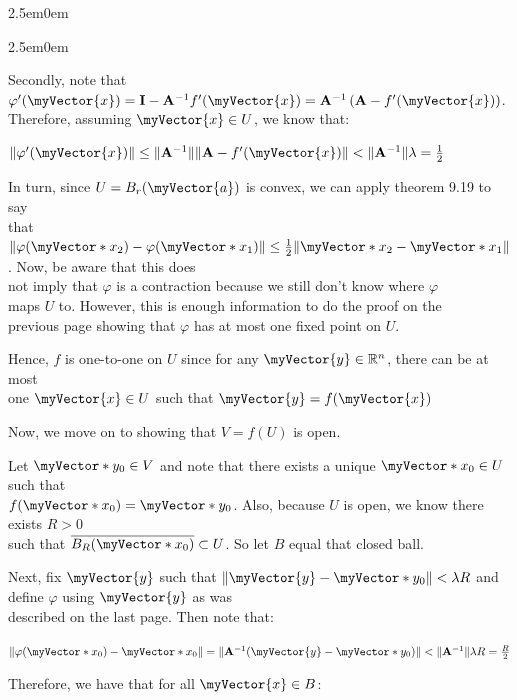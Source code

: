 \documentclass{book}
\newenvironment{myIndent}{%
   \begin{adjustwidth}{2.5em}{0em}%
}{%
   \end{adjustwidth}%
}
\newcommand{\retTwo}{\hfill\bigbreak}
\newcommand{\mVec}[1]{\myVector{#1}}
\newcommand{\mVecAst}[1]{\myVector*{#1}}
\newcommand{\mMat}[1]{\mathbf{#1}}
\begin{document}
{\begin{myIndent}
{\begin{myIndent}
      Secondly, note that $\varphi^\prime(\mVec{x}) = \mMat{I} - \mMat{A}^{-1}f^\prime(\mVec{x}) = \mMat{A}^{-1}\left(\mMat{A} - f^\prime(\mVec{x})\right)$.\\ Therefore, assuming $\mVec{x} \in U$, we know that:

      {\centering $\|\varphi^\prime(\mVec{x})\| \leq \|\mMat{A}^{-1}\|\|\mMat{A} - f^\prime(\mVec{x})\| < \|\mMat{A}^{-1}\|\lambda = \frac{1}{2}$ \retTwo\par}

      In turn, since $U = B_r(\mVec{a})$ is convex, we can apply theorem 9.19 to say\\ that $\|\varphi(\mVecAst{x}_2) - \varphi(\mVecAst{x}_1)\| \leq \frac{1}{2}\|\mVecAst{x}_2 - \mVecAst{x}_1\|$. Now, be aware that this does\\ not imply that $\varphi$ is a contraction because we still don't know where $\varphi$\\ maps $U$ to. However, this is enough information to do the proof on the\\ previous page showing that $\varphi$ has at most one fixed point on $U$.\retTwo
      
      Hence, $f$ is one-to-one on $U$ since for any $\mVec{y} \in \mathbb{R}^n$, there can be at most\\ one $\mVec{x} \in U$ such that $\mVec{y} = f(\mVec{x})$\retTwo\retTwo

      Now, we move on to showing that $V = f(U)$ is open.\retTwo
      
      Let $\mVecAst{y}_0 \in V$ and note that there exists a unique $\mVecAst{x}_0 \in U$ such that\\ [2pt] $f(\mVecAst{x}_0) = \mVecAst{y}_0$. Also, because $U$ is open, we know there exists $R > 0$\\ [2pt] such that $\overline{B_R(\mVecAst{x}_0)} \subset U$. So let $B$ equal that closed ball.

      \newpage

      Next, fix $\mVec{y}$ such that $\|\mVec{y} - \mVecAst{y}_0\| < \lambda R$ and define $\varphi$ using $\mVec{y}$ as was\\ described on the last page. Then note that:
      
      {\center $\|\varphi(\mVecAst{x}_0) - \mVecAst{x}_0\| = \|\mMat{A}^{-1}(\mVec{y} - \mVecAst{y}_0)\| < \|\mMat{A}^{-1}\|\lambda R = \frac{R}{2}$ \retTwo\par}

      Therefore, we have that for all $\mVec{x} \in B$:
      

\end{myIndent}}
\end{myIndent}}
\end{document}
